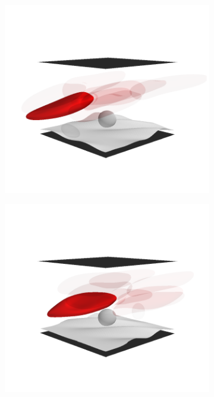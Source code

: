 \begin{figure}[th!]
    \begin{subfigure}[t]{0.5\textwidth}
        \includegraphics[trim=50 75 50 125, clip, width=\textwidth]{figures/unicycle1.png}
    \end{subfigure}%
    \begin{subfigure}[t]{0.5\textwidth}
        \includegraphics[trim=50 75 50 125, clip, width=\textwidth]{figures/unicycle2.png}
    \end{subfigure}


\end{figure}
